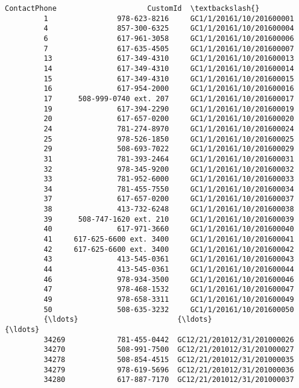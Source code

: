 \documentclass[11pt]{article}
\begin{document}
\begin{Verbatim}[commandchars=\\\{\}]
                          ContactPhone                     CustomId  \textbackslash{}
         1                978-623-8216     GC1/1/20161/10/201600001   
         4                857-300-6325     GC1/1/20161/10/201600004   
         6                617-961-3058     GC1/1/20161/10/201600006   
         7                617-635-4505     GC1/1/20161/10/201600007   
         13               617-349-4310     GC1/1/20161/10/201600013   
         14               617-349-4310     GC1/1/20161/10/201600014   
         15               617-349-4310     GC1/1/20161/10/201600015   
         16               617-954-2000     GC1/1/20161/10/201600016   
         17      508-999-0740 ext. 207     GC1/1/20161/10/201600017   
         19               617-394-2290     GC1/1/20161/10/201600019   
         20               617-657-0200     GC1/1/20161/10/201600020   
         24               781-274-8970     GC1/1/20161/10/201600024   
         25               978-526-1850     GC1/1/20161/10/201600025   
         29               508-693-7022     GC1/1/20161/10/201600029   
         31               781-393-2464     GC1/1/20161/10/201600031   
         32               978-345-9200     GC1/1/20161/10/201600032   
         33               781-952-6000     GC1/1/20161/10/201600033   
         34               781-455-7550     GC1/1/20161/10/201600034   
         37               617-657-0200     GC1/1/20161/10/201600037   
         38               413-732-6248     GC1/1/20161/10/201600038   
         39      508-747-1620 ext. 210     GC1/1/20161/10/201600039   
         40               617-971-3660     GC1/1/20161/10/201600040   
         41     617-625-6600 ext. 3400     GC1/1/20161/10/201600041   
         42     617-625-6600 ext. 3400     GC1/1/20161/10/201600042   
         43               413-545-0361     GC1/1/20161/10/201600043   
         44               413-545-0361     GC1/1/20161/10/201600044   
         46               978-934-3500     GC1/1/20161/10/201600046   
         47               978-468-1532     GC1/1/20161/10/201600047   
         49               978-658-3311     GC1/1/20161/10/201600049   
         50               508-635-3232     GC1/1/20161/10/201600050   
         {\ldots}                       {\ldots}                          {\ldots}   
         34269            781-455-0442  GC12/21/201012/31/201000026   
         34270            508-991-7500  GC12/21/201012/31/201000027   
         34278            508-854-4515  GC12/21/201012/31/201000035   
         34279            978-619-5696  GC12/21/201012/31/201000036   
         34280            617-887-7170  GC12/21/201012/31/201000037   

\end{Verbatim}
\end{document}
